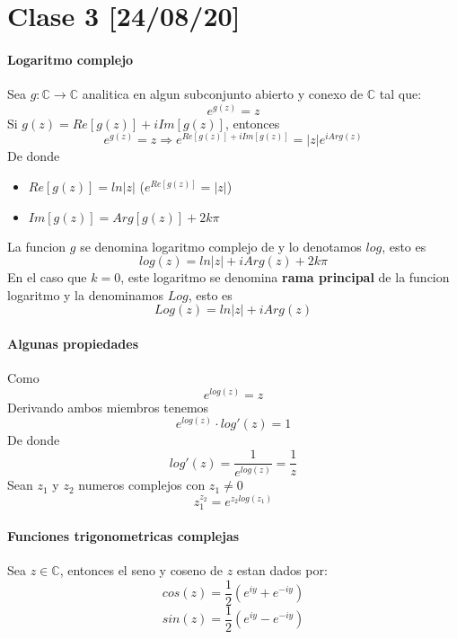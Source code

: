 \documentclass[10pt]{article}
\begin{document}
\section{Clase 3 [24/08/20]}

\paragraph{Logaritmo complejo} 
Sea $g: \mathbb{C}\rightarrow \mathbb{C}$ analitica en algun subconjunto abierto y conexo de $\mathbb{C}$ tal que:
\begin{equation*}
	e^{g(z)} = z
\end{equation*}
Si $g(z) = Re[g(z)] + i Im[g(z)]$, entonces
\begin{equation*}
	e^{g(z)} = z \Rightarrow e^{Re[g(z)] + i Im[g(z)]} = |z|e^{iArg(z)}
\end{equation*}
De donde
\begin{itemize}
	\item $Re[g(z)] = ln|z|$ ($e^{Re[g(z)]} = |z|$)
	\item $Im[g(z)] = Arg[g(z)] + 2k\pi$
\end{itemize}
La funcion $g$ se denomina logaritmo complejo de y lo denotamos $log$, esto es
\begin{equation*}
	log(z) = ln|z| + iArg(z)+2k\pi
\end{equation*}
En el caso que $k=0$, este logaritmo se denomina \textbf{rama principal} 
de la funcion logaritmo y la denominamos $Log$, esto es
\begin{equation*}
	Log(z) = ln|z| + iArg(z)
\end{equation*}
\paragraph{Algunas propiedades}
Como
\begin{equation*}
	e^{log(z)} = z
\end{equation*}
Derivando ambos miembros tenemos
\begin{equation*}
	e^{log(z)} \cdot log'(z) = 1
\end{equation*}
De donde
\begin{equation*}
	log'(z) =\dfrac{1}{e^{log(z)}} = \dfrac{1}{z}
\end{equation*}
Sean $z_1$ y $z_2$ numeros complejos con $z_1 \neq 0$
\begin{equation*}
	z_1^{z_2} = e^{z_2 log(z_1)}
\end{equation*}
\paragraph{Funciones trigonometricas complejas}
Sea $z \in \mathbb{C}$, entonces el seno y coseno de $z$ estan dados por:
\begin{equation*}
	cos(z) = \dfrac{1}{2}(e^{iy}+e^{-iy})
\end{equation*}
\begin{equation*}
	sin(z) = \dfrac{1}{2}(e^{iy}-e^{-iy})
\end{equation*}
\end{document}
